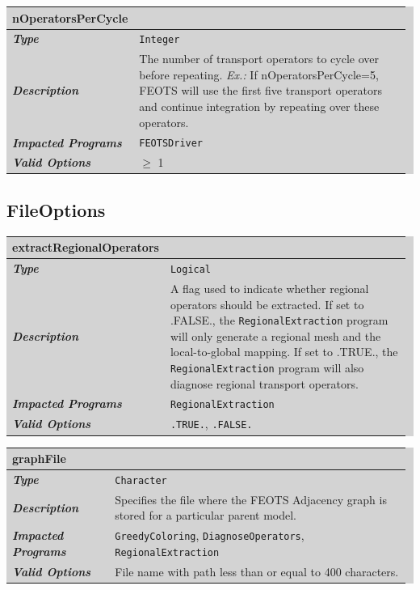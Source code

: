 \documentclass{softwaremanual}
\begin{document}

\noindent\begingroup\setlength{\fboxsep}{0pt}
\colorbox{lightgray}{
\begin{tabular}{p{0.25\linewidth} p{0.725\linewidth}}
\toprule
\textbf{nOperatorsPerCycle} & \\
\midrule
\textbf{\textit{Type}} & \texttt{Integer} \\
\midrule
\textbf{\textit{Description}} & The number of transport operators to cycle over before repeating. \textit{Ex.:} If nOperatorsPerCycle=5, FEOTS will use the first five transport operators and continue integration by repeating over these operators. \\
\midrule
\textbf{\textit{Impacted Programs}} & \texttt{FEOTSDriver} \\
\midrule
\textbf{\textit{Valid Options}}  & $\geq$ 1 \\
\bottomrule
\end{tabular}
}\endgroup

\subsection{FileOptions}\label{sec:FileOptions}
\noindent\begingroup\setlength{\fboxsep}{0pt}
\colorbox{lightgray}{
\begin{tabular}{p{0.25\linewidth} p{0.725\linewidth}}
\toprule
\textbf{extractRegionalOperators} & \\
\midrule
\textbf{\textit{Type}} & \texttt{Logical} \\
\midrule
\textbf{\textit{Description}} & A flag used to indicate whether regional operators should be extracted. If set to .FALSE., the \texttt{RegionalExtraction} program will only generate a regional mesh and the local-to-global mapping. If set to .TRUE., the \texttt{RegionalExtraction} program will also diagnose regional transport operators. \\
\midrule
\textbf{\textit{Impacted Programs}} & \texttt{RegionalExtraction} \\
\midrule
\textbf{\textit{Valid Options}}  & \texttt{.TRUE.}, \texttt{.FALSE.} \\
\bottomrule
\end{tabular}
}\endgroup


\noindent\begingroup\setlength{\fboxsep}{0pt}
\colorbox{lightgray}{
\begin{tabular}{p{0.25\linewidth} p{0.725\linewidth}}
\toprule
\textbf{graphFile} & \\
\midrule
\textbf{\textit{Type}} & \texttt{Character} \\
\midrule
\textbf{\textit{Description}} & Specifies the file where the FEOTS Adjacency graph is stored for a particular parent model.  \\
\midrule
\textbf{\textit{Impacted Programs}} & \texttt{GreedyColoring}, \texttt{DiagnoseOperators}, \texttt{RegionalExtraction} \\
\midrule
\textbf{\textit{Valid Options}}  & File name with path less than or equal to 400 characters. \\
\bottomrule
\end{tabular}
}\endgroup
\end{document}
